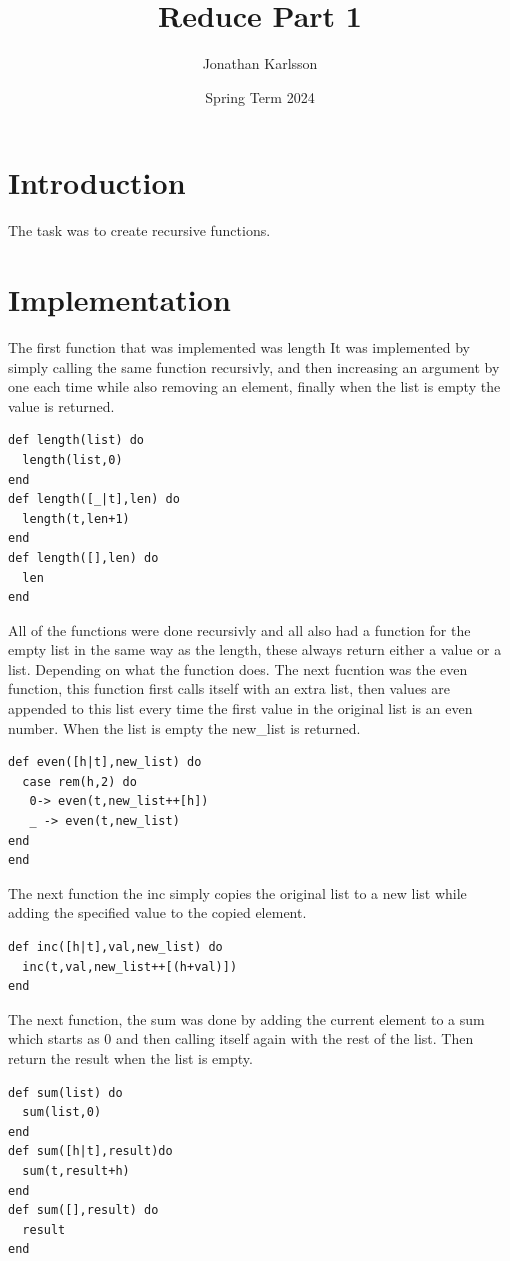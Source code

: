 \documentclass[a4paper,11pt]{article}
\begin{document}
\title{
    \textbf{Reduce Part 1}
}
\author{Jonathan Karlsson}
\date{Spring Term 2024}

\maketitle

\section*{Introduction}

The task was to create recursive functions.
\section*{Implementation}

The first function that was implemented was length It was implemented by simply calling the same function recursivly, and then increasing an argument by one each time while also removing an element, finally when the list is empty the value is returned.
\begin{verbatim}
def length(list) do
  length(list,0)
end
def length([_|t],len) do
  length(t,len+1)
end
def length([],len) do
  len
end
\end{verbatim}
All of the functions were done recursivly and all also had a function for the empty list in the same way as the length, these always return either a value or a list. Depending on what the function does. 
The next fucntion was the even function, this function first calls itself with an extra list, then values are appended to this list every time the first value in the original list is an even number. When the list is empty the new\_list is returned.
\begin{verbatim}
def even([h|t],new_list) do
  case rem(h,2) do
   0-> even(t,new_list++[h])
   _ -> even(t,new_list)
end
end
\end{verbatim}
The next function the inc simply copies the original list to a new list while adding the specified value to the copied element.
\begin{verbatim}
def inc([h|t],val,new_list) do
  inc(t,val,new_list++[(h+val)])
end
\end{verbatim}
The next function, the sum was done by adding the current element to a sum which starts as 0 and then calling itself again with the rest of the list. Then return the result when the list is empty.
\begin{verbatim}
def sum(list) do
  sum(list,0)
end
def sum([h|t],result)do
  sum(t,result+h)
end
def sum([],result) do
  result
end
\end{verbatim}
\end{document}
